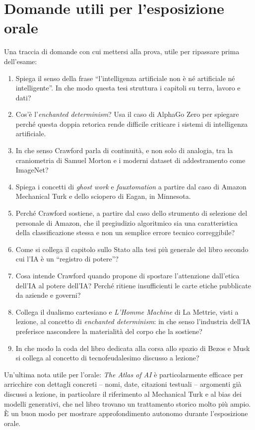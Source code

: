 \documentclass[a4paper,11pt]{article}
\begin{document}
\section{Domande utili per l'esposizione orale}

Una traccia di domande con cui mettersi alla prova, utile per ripassare prima dell'esame:

\begin{enumerate}
  \item Spiega il senso della frase ``l'intelligenza artificiale non è né artificiale né intelligente''. In che modo questa tesi struttura i capitoli su terra, lavoro e dati?
  \item Cos'è l'\emph{enchanted determinism}? Usa il caso di AlphaGo Zero per spiegare perché questa doppia retorica rende difficile criticare i sistemi di intelligenza artificiale.
  \item In che senso Crawford parla di continuità, e non solo di analogia, tra la craniometria di Samuel Morton e i moderni dataset di addestramento come ImageNet?
  \item Spiega i concetti di \emph{ghost work} e \emph{fauxtomation} a partire dal caso di Amazon Mechanical Turk e dello sciopero di Eagan, in Minnesota.
  \item Perché Crawford sostiene, a partire dal caso dello strumento di selezione del personale di Amazon, che il pregiudizio algoritmico sia una caratteristica della classificazione stessa e non un semplice errore tecnico correggibile?
  \item Come si collega il capitolo sullo Stato alla tesi più generale del libro secondo cui l'IA è un ``registro di potere''?
  \item Cosa intende Crawford quando propone di spostare l'attenzione dall'etica dell'IA al potere dell'IA? Perché ritiene insufficienti le carte etiche pubblicate da aziende e governi?
  \item Collega il dualismo cartesiano e \emph{L'Homme Machine} di La Mettrie, visti a lezione, al concetto di \emph{enchanted determinism}: in che senso l'industria dell'IA preferisce nascondere la materialità del corpo che la sostiene?
  \item In che modo la coda del libro dedicata alla corsa allo spazio di Bezos e Musk si collega al concetto di tecnofeudalesimo discusso a lezione?
\end{enumerate}

Un'ultima nota utile per l'orale: \emph{The Atlas of AI} è particolarmente efficace per arricchire con dettagli concreti -- nomi, date, citazioni testuali -- argomenti già discussi a lezione, in particolare il riferimento al Mechanical Turk e al bias dei modelli generativi, che nel libro trovano un trattamento storico molto più ampio. È un buon modo per mostrare approfondimento autonomo durante l'esposizione orale.
\end{document}
